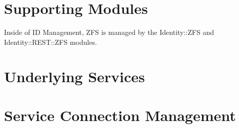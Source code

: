 \documentclass[letterpaper,12pt,titlepage]{article}
\begin{document}
\section{Supporting Modules}
Inside of ID Management, ZFS is managed by the Identity::ZFS and Identity::REST::ZFS modules. 

\section{Underlying Services}

\section{Service Connection Management}

\end{document}
